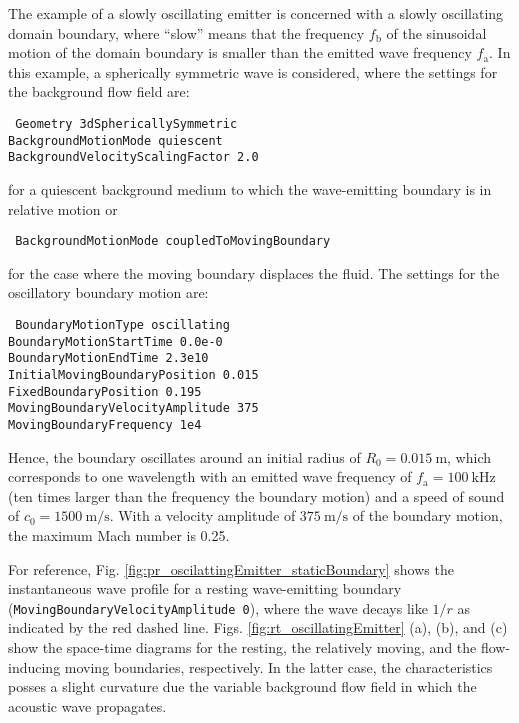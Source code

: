 The example of a slowly oscillating emitter is concerned with a slowly oscillating domain boundary, where ``slow'' means that the frequency $f_{\mathrm{b}}$ of the sinusoidal motion of the domain boundary is smaller than the emitted wave frequency $f_{\mathrm{a}}$. In this example, a spherically symmetric wave is considered, where the settings for the background flow field are:

{\tt
Geometry 3dSphericallySymmetric \\
BackgroundMotionMode quiescent \\
BackgroundVelocityScalingFactor 2.0
}

for a quiescent background medium to which the wave-emitting boundary is in relative motion or

    {\tt
        BackgroundMotionMode coupledToMovingBoundary\\
    }

for the case where the moving boundary displaces the fluid. The settings for the oscillatory boundary motion are:

{\tt
BoundaryMotionType oscillating \\
BoundaryMotionStartTime 0.0e-0 \\
BoundaryMotionEndTime 2.3e10 \\
InitialMovingBoundaryPosition 0.015 \\
FixedBoundaryPosition 0.195 \\
MovingBoundaryVelocityAmplitude 375 \\
MovingBoundaryFrequency 1e4
}

Hence, the boundary oscillates around an initial radius of $R_0=0.015\:\mathrm{m}$, which corresponds to one wavelength with an emitted wave frequency of $f_{\mathrm{a}}=100\:\mathrm{kHz}$ (ten times larger than the frequency the boundary motion) and a speed of sound of $c_0=1500\:\mathrm{m/s}$. With a velocity amplitude of $375\:\mathrm{m/s}$ of the boundary motion, the maximum Mach number is 0.25.

For reference, Fig. \ref{fig:pr_oscilattingEmitter_staticBoundary} shows the instantaneous wave profile for a resting wave-emitting boundary ({\tt MovingBoundaryVelocityAmplitude 0}), where the wave decays like $1/r$ as indicated by the red dashed line. Figs. \ref{fig:rt_oscillatingEmitter} (a), (b), and (c) show the space-time diagrams for the resting, the relatively moving, and the flow-inducing moving boundaries, respectively. In the latter case, the characteristics posses a slight curvature due the variable background flow field in which the acoustic wave propagates.

